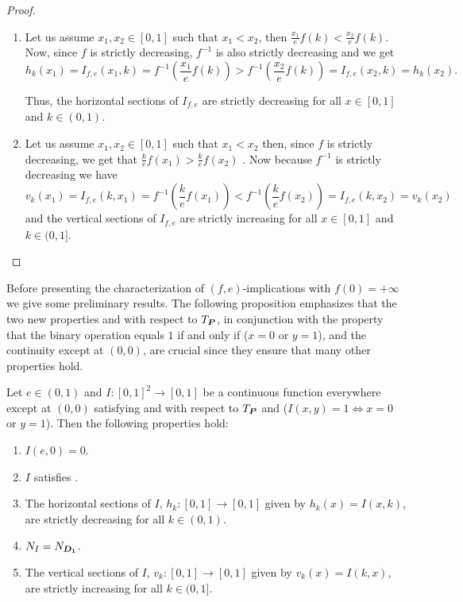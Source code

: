 \begin{proof}
	\begin{enumerate}[label=(\roman*)]
		\item Let us assume $x_1,x_2\in [0,1]$ such that $x_1 < x_2$, then $\frac{x_1}{e}f(k) < \frac{x_2}{e}f(k)$. Now, since $f$ is strictly decreasing, $f^{-1}$ is also strictly decreasing and we get
		$$h_k(x_1)=I_{f,e}(x_1,k)=f^{-1}\left(\frac{x_1}{e} f(k)\right) > f^{-1} \left(\frac{x_2}{e}f(k)\right) = I_{f,e}(x_2,k)=h_k(x_2).$$
		
		Thus, the horizontal sections of $I_{f,e}$ are strictly decreasing for all $x \in [0,1]$ and $k\in (0,1)$.
		\item Let us assume $x_1,x_2 \in [0,1]$ such that $x_1<x_2$ then, since $f$ is strictly decreasing, we get that $\frac{k}{e}f(x_1) > \frac{k}{e}f(x_2)$ . Now because $f^{-1}$ is strictly decreasing we have
		$$v_k(x_1)=I_{f,e}(k,x_1)=f^{-1}\left(\frac{k}{e}f(x_1)\right) < f^{-1}\left(\frac{k}{e}f(x_2)\right) = I_{f,e}(k,x_2)=v_k(x_2)$$
		\noindent and the vertical sections of $I_{f,e}$ are strictly increasing for all $x\in [0,1]$ and $k \in (0,1]$.
	\end{enumerate}
\end{proof}


Before presenting the characterization of $(f,e)$-implications with $f(0)=+\infty$ we give some preliminary results. The following proposition emphasizes that the two new properties \LIey and \LIex with respect to $T_{\bm{P}}$, in conjunction with the property that the binary operation equals $1$ if and only if ($x=0$ or $y=1$), and the continuity except at $(0,0)$, are crucial since they ensure that many other properties hold.

\begin{lemma}\label{lema-previ2} 
	Let $e\in(0,1)$ and $I:[0,1]^2\to [0,1]$ be a continuous function everywhere except at $(0,0)$ satisfying \LIey and \LIex with respect to $T_{\bm{P}}$ and ($I(x,y)=1\Leftrightarrow x=0$ or $y=1$). Then the following properties hold:
	\begin{enumerate}[label=(\roman*)]
		\item $I(e,0)=0$.
		\item $I$ satisfies \NPe.
		\item The horizontal sections of $I$, $h_k:[0,1]\to[0,1]$ given by $h_k(x)=I(x,k)$, are strictly decreasing for all $k\in(0,1)$.
		\item $N_I=N_{\bm{D_1}}$.
		\item The vertical sections of $I$, $v_k:[0,1]\to[0,1]$ given by $v_k(x)=I(k,x)$, are strictly increasing for all $k\in(0,1]$.
	\end{enumerate}
\end{lemma}

